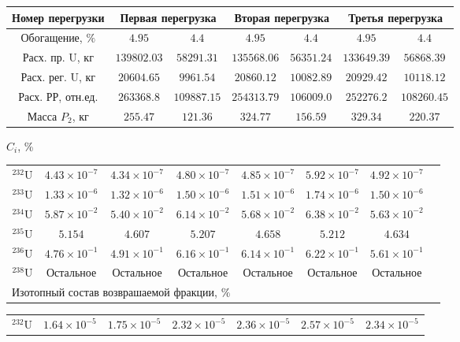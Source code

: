\begin{table}
\begin{tabular}{|c|c|c|c|c|c|c|}
    \hline \multicolumn{1}{c|}{ Номер перегрузки } & \multicolumn{2}{|c|}{ Первая перегрузка } & \multicolumn{2}{c|}{ Вторая перегрузка } & \multicolumn{2}{|c}{ Третья перегрузка } \\
    \hline Обогащение, $\%$ & $4.95$ & $4.4$ & $4.95$ & $4.4$ & $4.95$ & $4.4$ \\
    Расх. пр. U, кг & $139802.03$ & $58291.31$ & $135568.06$ & $56351.24$ & $133649.39$ & $56868.39$ \\
    Расх. рег. U, кг & $20604.65$ & $9961.54$ & $20860.12$ & $10082.89$ & $20929.42$ & $10118.12$ \\
    Расх. РР, отн.ед. & $263368.8$ & $109887.15$ & $254313.79$ & $106009.0$ & $252276.2$ & $108260.45$ \\
    Масса $P_2$, кг & $255.47$ & $121.36$ & $324.77$ & $156.59$ & $329.34$ & $220.37$ \\
    \hline
    \end{tabular}
    $C_i$, \%
    \begin{tabular}{c|c|c|c|c|c|c|c}
    \hline${ }^{232} \mathrm{U}$ & $4.43 \times 10^{-7}$ & $4.34 \times 10^{-7}$ & $4.80 \times 10^{-7}$ & $4.85 \times 10^{-7}$ & $5.92 \times 10^{-7}$ & $4.92 \times 10^{-7}$ \\
    ${ }^{233} \mathrm{U}$ & $1.33 \times 10^{-6}$ & $1.32 \times 10^{-6}$ & $1.50 \times 10^{-6}$ & $1.51 \times 10^{-6}$ & $1.74 \times 10^{-6}$ & $1.50 \times 10^{-6}$ \\
    ${ }^{234} \mathrm{U}$ & $5.87 \times 10^{-2}$ & $5.40 \times 10^{-2}$ & $6.14 \times 10^{-2}$ & $5.68 \times 10^{-2}$ & $6.38 \times 10^{-2}$ & $5.63 \times 10^{-2}$ \\
    ${ }^{235} \mathrm{U}$ & $5.154$ & $4.607$ & $5.207$ & $4.658$ & $5.212$ & $4.634$ \\
    ${ }^{236} \mathrm{U}$ & $4.76 \times 10^{-1}$ & $4.91 \times 10^{-1}$ & $6.16 \times 10^{-1}$ & $6.14 \times 10^{-1}$ & $6.22 \times 10^{-1}$ & $5.61 \times 10^{-1}$ \\
    ${ }^{238} \mathrm{U}$ & Остальное & Остальное & Остальное & Остальное & Остальное & Остальное \\
    \hline \multicolumn{4}{|c|}{ Изотопный состав возврашаемой фракции, $\%$}
    \end{tabular}
    \begin{tabular}{|c|c|c|c|c|c|c|}
    \hline ${ }^{232} \mathrm{U}$ & $1.64 \times 10^{-5}$ & $1.75 \times 10^{-5}$ & $2.32 \times 10^{-5}$ & $2.36 \times 10^{-5}$ & $2.57 \times 10^{-5}$ & $2.34 \times 10^{-5}$ \\

\end{tabular}
\end{table}
